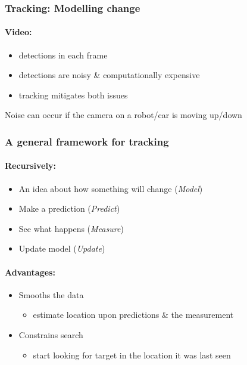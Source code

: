 \documentclass[paper=a4, fontsize=11pt]{article} %
\numberwithin{equation}{section} %
\numberwithin{figure}{section} %
\numberwithin{table}{section} %
\begin{document}
\subsubsection{Tracking: Modelling change}

\paragraph{Video:}
\begin{itemize}
\item detections in each frame
\item detections are noisy \& computationally expensive
\item tracking mitigates both issues
\end{itemize}

Noise can occur if the camera on a robot/car is moving up/down

\subsubsection{A general framework for tracking}

\paragraph{Recursively:}
\begin{itemize}
\item An idea about how something will change (\textit{Model})
\item Make a prediction (\textit{Predict})
\item See what happens (\textit{Measure})
\item Update model (\textit{Update})
\end{itemize}

\paragraph{Advantages:}
\begin{itemize}
\item Smooths the data 
	\begin{itemize}
	\item	estimate location upon predictions  \& the measurement
	\end{itemize}
\item Constrains search
	\begin{itemize}
	\item start looking for target in the location it was last seen		
	\end{itemize}
\end{itemize}
\end{document}
